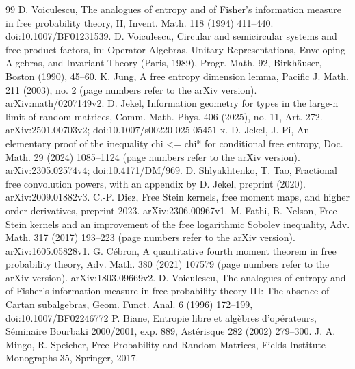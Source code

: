 \documentclass[11pt]{article}
\begin{document}
\begin{thebibliography}{99}
\small
{} D. Voiculescu, The analogues of entropy and of Fisher's information measure in free probability theory, II, Invent. Math. 118 (1994) 411--440. doi:10.1007/BF01231539.
 D. Voiculescu, Circular and semicircular systems and free product factors, in: Operator Algebras, Unitary Representations, Enveloping Algebras, and Invariant Theory (Paris, 1989), Progr. Math. 92, Birkh\"auser, Boston (1990), 45--60.
 K. Jung, A free entropy dimension lemma, Pacific J. Math. 211 (2003), no. 2 (page numbers refer to the arXiv version). arXiv:math/0207149v2.
 D. Jekel, Information geometry for types in the large-n limit of random matrices, Comm. Math. Phys. 406 (2025), no. 11, Art. 272. arXiv:2501.00703v2; doi:10.1007/s00220-025-05451-x.
 D. Jekel, J. Pi, An elementary proof of the inequality chi <= chi* for conditional free entropy, Doc. Math. 29 (2024) 1085--1124 (page numbers refer to the arXiv version). arXiv:2305.02574v4; doi:10.4171/DM/969.
 D. Shlyakhtenko, T. Tao, Fractional free convolution powers, with an appendix by D. Jekel, preprint (2020). arXiv:2009.01882v3.
 C.-P. Diez, Free Stein kernels, free moment maps, and higher order derivatives, preprint 2023. arXiv:2306.00967v1.
 M. Fathi, B. Nelson, Free Stein kernels and an improvement of the free logarithmic Sobolev inequality, Adv. Math. 317 (2017) 193--223 (page numbers refer to the arXiv version). arXiv:1605.05828v1.
 G. Cébron, A quantitative fourth moment theorem in free probability theory, Adv. Math. 380 (2021) 107579 (page numbers refer to the arXiv version). arXiv:1803.09669v2.
 D. Voiculescu, The analogues of entropy and of Fisher's information measure in free probability theory III: The absence of Cartan subalgebras, Geom. Funct. Anal. 6 (1996) 172--199, doi:10.1007/BF02246772
 P. Biane, Entropie libre et algèbres d'opérateurs, Séminaire Bourbaki 2000/2001, exp. 889, Astérisque 282 (2002) 279--300.
 J. A. Mingo, R. Speicher, Free Probability and Random Matrices, Fields Institute Monographs 35, Springer, 2017.

\end{thebibliography}
\end{document}
